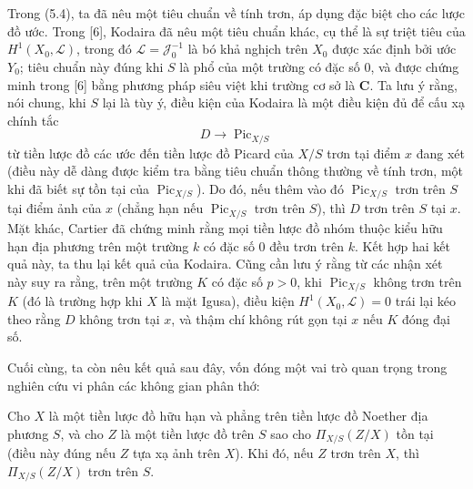 Trong (5.4), ta đã nêu một tiêu chuẩn về tính trơn, áp dụng đặc biệt cho các
lược đồ ước. Trong [6], Kodaira đã nêu một tiêu chuẩn khác, cụ thể là sự triệt
tiêu của $H^1(X_0,\mathcal L)$, trong đó $\mathcal L=\mathcal J_0^{-1}$ là bó
khả nghịch trên $X_0$ được xác định bởi ước $Y_0$; tiêu chuẩn này đúng khi $S$
là phổ của một trường có đặc số 0, và được chứng minh trong [6] bằng phương
pháp siêu việt khi trường cơ sở là $\mathbf C$. Ta lưu ý rằng, nói chung, khi
$S$ lại là tùy ý, điều kiện của Kodaira là một điều kiện đủ để cấu xạ chính tắc
\[
D\longrightarrow\operatorname{Pic}_{X/S}
\]
từ tiền lược đồ các ước đến tiền lược đồ Picard của $X/S$ trơn tại điểm $x$
đang xét (điều này dễ dàng được kiểm tra bằng tiêu chuẩn thông thường về tính
trơn, một khi đã biết sự tồn tại của $\operatorname{Pic}_{X/S}$). Do đó, nếu
thêm vào đó $\operatorname{Pic}_{X/S}$ trơn trên $S$ tại điểm ảnh của $x$
(chẳng hạn nếu $\operatorname{Pic}_{X/S}$ trơn trên $S$), thì $D$ trơn trên
$S$ tại $x$. Mặt khác, Cartier đã chứng minh rằng mọi tiền lược đồ nhóm thuộc
kiểu hữu hạn địa phương trên một trường $k$ có đặc số 0 đều trơn trên $k$. Kết
hợp hai kết quả này, ta thu lại kết quả của Kodaira. Cũng cần lưu ý rằng từ các
nhận xét này suy ra rằng, trên một trường $K$ có đặc số $p>0$, khi
$\operatorname{Pic}_{X/S}$ không trơn trên $K$ (đó là trường hợp khi $X$ là
mặt Igusa), điều kiện $H^1(X_0,\mathcal L)=0$ trái lại kéo theo rằng $D$ không
trơn tại $x$, và thậm chí không rút gọn tại $x$ nếu $K$ đóng đại số.

Cuối cùng, ta còn nêu kết quả sau đây, vốn đóng một vai trò quan trọng trong
nghiên cứu vi phân các không gian phân thớ:

 Cho $X$ là một tiền lược đồ hữu hạn và phẳng trên tiền
lược đồ Noether địa phương $S$, và cho $Z$ là một tiền lược đồ trên $S$ sao
cho $\Pi_{X/S}(Z/X)$ tồn tại (điều này đúng nếu $Z$ tựa xạ ảnh trên $X$). Khi
đó, nếu $Z$ trơn trên $X$, thì $\Pi_{X/S}(Z/X)$ trơn trên $S$.

